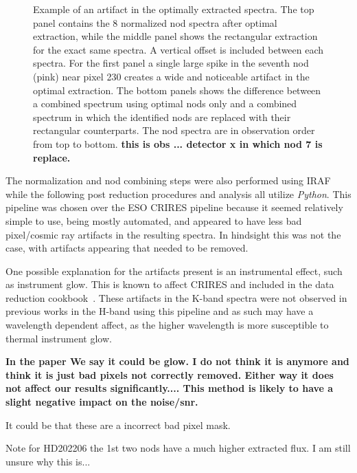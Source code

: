 \begin{figure}
    \caption{Example of an artifact in the optimally extracted spectra. The top panel contains the 8 normalized nod spectra after optimal extraction, while the middle panel shows the rectangular extraction for the exact same spectra. A vertical offset is included between each spectra. For the first panel a single large spike in the seventh nod (pink) near pixel 230 creates a wide and noticeable artifact in the optimal extraction. The bottom panels shows the difference between a combined spectrum using optimal nods only and a combined spectrum in which the identified nods are replaced with their rectangular counterparts. The nod spectra are in observation order from top to bottom.  \textbf{this is obs ... detector x in which nod 7 is replace.}}
    \label{fig:badpixelreplacement}
\end{figure}




The normalization and nod combining steps were also performed using IRAF while the following post reduction procedures and analysis all utilize \emph{Python}. This pipeline was chosen over the ESO CRIRES pipeline because it seemed relatively simple to use, being mostly automated, and appeared to have less bad pixel/cosmic ray artifacts in the resulting spectra. In hindsight this was not the case, with artifacts appearing that needed to be removed. 

One possible explanation for the artifacts present is an instrumental effect, such as instrument glow. This is known to affect CRIRES and included in the data reduction cookbook~\citep{smoker_very_2012}. These artifacts in the K-band spectra were not observed in previous works in the H-band using this pipeline and as such may have a wavelength dependent affect, as the higher wavelength {\nir} is more susceptible to thermal instrument glow.



\textbf{In the paper We say it could be glow. I do not think it is anymore and think it is just bad pixels not correctly removed. Either way it does not affect our results significantly....
This method is likely to have a slight negative impact on the noise/snr.}

It could be that these are a incorrect bad pixel mask.


Note for HD202206 the 1st two nods have a much higher extracted flux. I am still unsure why this is...


